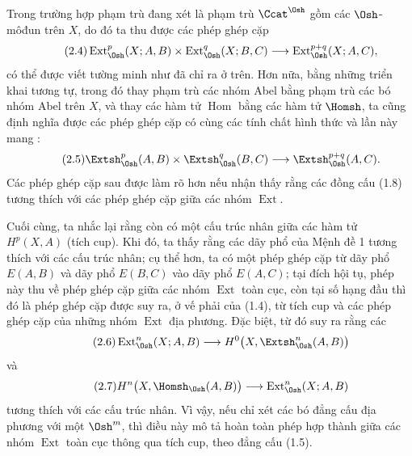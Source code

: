 Trong trường hợp phạm trù đang xét là phạm trù $\Ccat^{\Osh}$ gồm các
$\Osh$-môđun trên $X$, do đó ta thu được các phép ghép cặp
\begin{equation}\tag{2.4}
  \operatorname{Ext}_{\Osh}^{p}(X;A,B)
  \times\operatorname{Ext}_{\Osh}^{q}(X;B,C)
  \longrightarrow\operatorname{Ext}_{\Osh}^{p+q}(X;A,C),
\end{equation}
có thể được viết tường minh như đã chỉ ra ở trên. Hơn nữa, bằng những triển khai tương tự,
trong đó thay phạm trù các nhóm Abel bằng phạm trù các bó nhóm Abel trên $X$, và thay các hàm tử
$\operatorname{Hom}$ bằng các hàm tử $\Homsh$, ta cũng định nghĩa được các phép ghép cặp có cùng
các tính chất hình thức và lần này mang :
\begin{equation}\tag{2.5}
  \Extsh_{\Osh}^{p}(A,B)\times\Extsh_{\Osh}^{q}(B,C)
  \longrightarrow\Extsh_{\Osh}^{p+q}(A,C).
\end{equation}
Các phép ghép cặp sau được làm rõ hơn nếu nhận thấy rằng các đồng cấu (1.8) tương thích
với các phép ghép cặp giữa các nhóm $\operatorname{Ext}$.

Cuối cùng, ta nhắc lại rằng còn có một cấu trúc nhân giữa các hàm tử
$H^{p}(X,A)$ (tích cup). Khi đó, ta thấy rằng các dãy phổ của
Mệnh đề 1 tương thích với các cấu trúc nhân; cụ thể hơn,
ta có một phép ghép cặp từ dãy phổ $E(A,B)$ và dãy phổ
$E(B,C)$ vào dãy phổ $E(A,C)$; tại đích hội tụ, phép này
thu về phép ghép cặp giữa các nhóm $\operatorname{Ext}$ toàn cục, còn tại
số hạng đầu thì đó là phép ghép cặp được suy ra, ở vế phải của (1.4), từ
tích cup và các phép ghép cặp của những nhóm $\operatorname{Ext}$ địa phương. Đặc biệt, từ đó suy ra
rằng các 
\begin{equation}\tag{2.6}
  \operatorname{Ext}_{\Osh}^{n}(X;A,B)
  \longrightarrow H^{0}\bigl(X,\Extsh_{\Osh}^{n}(A,B)\bigr)
\end{equation}
và
\begin{equation}\tag{2.7}
  H^{n}\bigl(X,\Homsh_{\Osh}(A,B)\bigr)
  \longrightarrow\operatorname{Ext}_{\Osh}^{n}(X;A,B)
\end{equation}
tương thích với các cấu trúc nhân. Vì vậy, nếu chỉ xét
các bó đẳng cấu địa phương với một $\Osh^{m}$, thì điều này mô tả hoàn toàn
phép hợp thành giữa các nhóm $\operatorname{Ext}$ toàn cục thông qua tích cup, theo
đẳng cấu (1.5).


